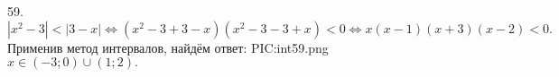 59. $|x^2-3|<|3-x|\Leftrightarrow (x^2-3+3-x)(x^2-3-3+x)<0 \Leftrightarrow x(x-1)(x+3)(x-2)<0.$ Применив метод интервалов, найдём ответ:
{{PIC:int59.png}}
$x\in(-3;0)\cup(1;2).$\\
